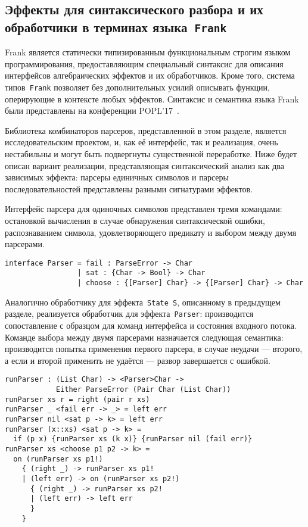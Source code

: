 \documentclass [a4paper] {article}
\begin{document}
\subsection{Эффекты для синтаксического разбора и их обработчики  
            в терминах языка~\texttt{Frank}}

Frank является статически типизированным функциональным
строгим языком программирования, предоставляющим специальный синтаксис для 
описания интерфейсов алгебраических эффектов и их обработчиков.
Кроме того, система типов~\texttt{Frank} позволяет без дополнительных усилий описывать
функции, оперирующие в контексте любых эффектов. Синтаксис и семантика языка
Frank были представлены на конференции POPL'17~\cite{Frank}.

Библиотека комбинаторов парсеров, представленной в этом разделе, является 
исследовательским проектом, и, как её интерфейс, так и реализация, очень 
нестабильны и могут быть подвергнуты существенной переработке. 
Ниже будет описан вариант реализации, представляющая синтаксический анализ
как два зависимых эффекта: парсеры единичных символов и парсеры
последовательностей представлены разными сигнатурами эффектов.   

Интерфейс парсера для одиночных символов представлен тремя командами: остановкой
вычисления в случае обнаружения синтаксической ошибки, распознаванием символа,
удовлетворяющего предикату и выбором между двумя парсерами.

\begin{verbatim}
interface Parser = fail : ParseError -> Char
                 | sat : {Char -> Bool} -> Char
                 | choose : {[Parser] Char} -> {[Parser] Char} -> Char
\end{verbatim}

Аналогично обработчику для эффекта~\texttt{State S}, описанному в предыдущем
разделе, реализуется обработчик для эффекта~\texttt{Parser}: производится
сопоставление с образцом для команд интерфейса и состояния входного потока.
Команде выбора между двумя парсерами назначается следующая семантика:
производится попытка применения первого парсера, в случае неудачи --- второго, а
если и второй применить не удаётся --- развор завершается с ошибкой. 

\begin{verbatim}
runParser : (List Char) -> <Parser>Char -> 
            Either ParseError (Pair Char (List Char))
runParser xs r = right (pair r xs)
runParser _ <fail err -> _> = left err
runParser nil <sat p -> k> = left err
runParser (x::xs) <sat p -> k> = 
  if (p x) {runParser xs (k x)} {runParser nil (fail err)}
runParser xs <choose p1 p2 -> k> = 
  on (runParser xs p1!)
    { (right _) -> runParser xs p1!
    | (left err) -> on (runParser xs p2!) 
      { (right _) -> runParser xs p2!
      | (left err) -> left err
      }
    }
\end{verbatim}
\end{document}
